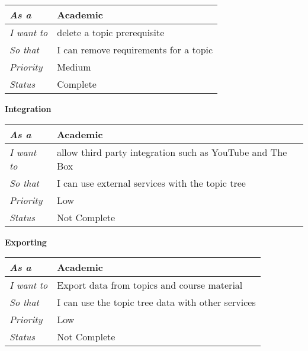 \begin{table}[h!]
\begin{tabular}{|l|l|}
\hline
\textit{As a}      & Academic                                                                               \\ \hline
\textit{I want to} & delete a topic prerequisite                                                            \\ \hline
\textit{So that}   & I can remove requirements for a topic \\ \hline
\textit{Priority}  & {\color[HTML]{FE996B} Medium}                                                          \\ \hline
\textit{Status}    & Complete                                                                               \\ \hline
\end{tabular}
\end{table}
\FloatBarrier
\textbf{Integration}
\FloatBarrier
\begin{table}[h!]
\begin{tabular}{|l|l|}
\hline
\textit{As a}      & Academic                                                  \\ \hline
\textit{I want to} & allow third party integration such as YouTube and The Box \\ \hline
\textit{So that}   & I can use external services with the topic tree           \\ \hline
\textit{Priority}  & {\color[HTML]{3531FF} Low}                                \\ \hline
\textit{Status}    & Not Complete                                              \\ \hline
\end{tabular}
\end{table}
\FloatBarrier
\textbf{Exporting}
\FloatBarrier
\begin{table}[h!]
\begin{tabular}{|l|l|}
\hline
\textit{As a}      & Academic                                          \\ \hline
\textit{I want to} & Export data from topics and course material       \\ \hline
\textit{So that}   & I can use the topic tree data with other services \\ \hline
\textit{Priority}  & {\color[HTML]{3531FF} Low}                        \\ \hline
\textit{Status}    & Not Complete                                      \\ \hline
\end{tabular}
\end{table}
\FloatBarrier
